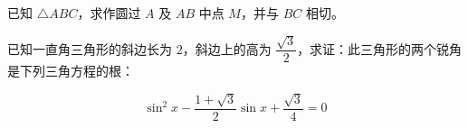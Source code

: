 \Needspace{0.4\textheight}
\begin{question}
已知 $\triangle ABC$，求作圆过 $A$ 及 $AB$ 中点 $M$，并与 $BC$ 相切。
\nopagebreak[4]
\begin{center}\end{center}
\nopagebreak[4]
\end{question}

\Needspace{0.4\textheight}
\begin{question}
已知一直角三角形的斜边长为 $2$，斜边上的高为 $\dfrac{\sqrt3}{2}$，求证：此三角形的两个锐角是下列三角方程的根：

\nopagebreak[4]
\[
\sin^2x-\frac{1+\sqrt3}{2}\sin x+\frac{\sqrt3}{4}=0
\]
\nopagebreak[4]
\begin{center}\end{center}
\nopagebreak[4]

\end{question}
